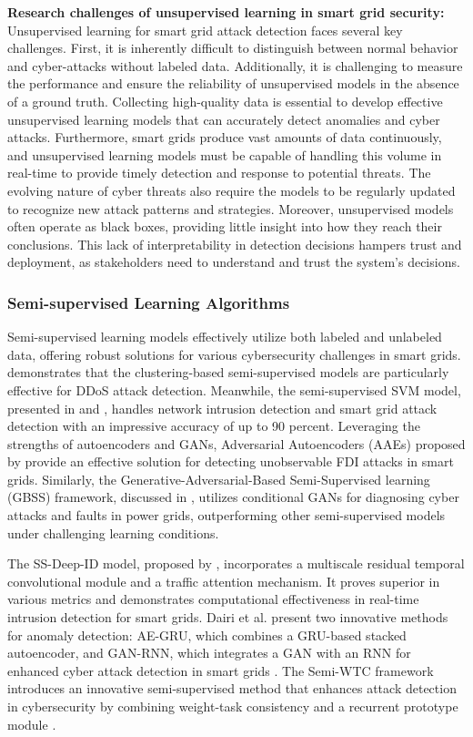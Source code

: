 \documentclass[10pt, journal]{IEEEtran}
\begin{document}
{\bf Research challenges of unsupervised learning in smart grid security:} Unsupervised learning for smart grid attack detection faces several key challenges. First, it is inherently difficult to distinguish between normal behavior and cyber-attacks without labeled data. Additionally, it is challenging to measure the performance and ensure the reliability of unsupervised models in the absence of a ground truth. Collecting high-quality data is essential to develop effective unsupervised learning models that can accurately detect anomalies and cyber attacks. Furthermore, smart grids produce vast amounts of data continuously, and unsupervised learning models must be capable of handling this volume in real-time to provide timely detection and response to potential threats. The evolving nature of cyber threats also require the models to be regularly updated to recognize new attack patterns and strategies. Moreover, unsupervised models often operate as black boxes, providing little insight into how they reach their conclusions. This lack of interpretability in detection decisions hampers trust and deployment, as stakeholders need to understand and trust the system’s decisions. 

			
\subsubsection{Semi-supervised Learning Algorithms}
Semi-supervised learning models effectively utilize both labeled and unlabeled data, offering robust solutions for various cybersecurity challenges in smart grids. \cite{aamir2021clustering} demonstrates that the clustering-based semi-supervised models are particularly effective for DDoS attack detection. Meanwhile, the semi-supervised SVM model, presented in \cite{haweliya2014network} and \cite{ozay2015machine}, handles network intrusion detection and smart grid attack detection with an impressive accuracy of up to 90 percent. Leveraging the strengths of autoencoders and GANs, Adversarial Autoencoders (AAEs) proposed by \cite{zhang2020detecting} provide an effective solution for detecting unobservable FDI attacks in smart grids. Similarly, the Generative-Adversarial-Based Semi-Supervised learning (GBSS) framework, discussed in \cite{farajzadeh2021adversarial}, utilizes conditional GANs for diagnosing cyber attacks and faults in power grids, outperforming other semi-supervised models under challenging learning conditions. 

The SS-Deep-ID model, proposed by \cite{abdel2021semi}, incorporates a multiscale residual temporal convolutional module and a traffic attention mechanism. It proves superior in various metrics and demonstrates computational effectiveness in real-time intrusion detection for smart grids. Dairi et al. present two innovative methods for anomaly detection: AE-GRU, which combines a GRU-based stacked autoencoder, and GAN-RNN, which integrates a GAN with an RNN for enhanced cyber attack detection in smart grids \cite{dairi2023semi}. The Semi-WTC framework introduces an innovative semi-supervised method that enhances attack detection in cybersecurity by combining weight-task consistency and a recurrent prototype module \cite{li2022semi}. 
\end{document}
